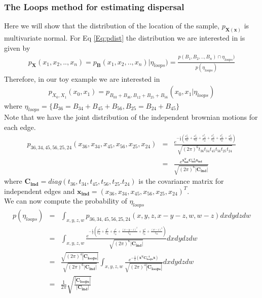 \subsubsection{The Loops method for estimating dispersal}
Here we will show that the distribution of the location of the sample, $p_\mathbf{X(x) }$ is multivariate normal.
For Eq \ref{Eq:pdist} the distribution we are interested in is given by 
\begin{eqnarray*}
     p_\mathbf{X}(x_1,x_2,..,x_n) = p_\mathbf{B}(x_1,x_2,..,x_n) | \eta_{loops}) = \frac{p(B_1,B_2,..,B_n) \cap \eta_{loops})}{p(\eta_{loops})}
\end{eqnarray*}
Therefore, in our toy example we are interested in 
\begin{eqnarray*}
     p_{X_0,X_1}(x_0,x_1) = p_{B_{03} + B_{36},B_{12}+B_{25}+B_{56}}(x_0,x_1 | \eta_{loops})
     \end{eqnarray*}
where $\eta_{loops} = \{ B_{36} = B_{34} + B_{45} + B_{56}, B_{25} = B_{24} + B_{45}  \} $ \\ 
Note that we have the joint distribution of the independent brownian motions for each edge. 
\begin{eqnarray*}
    p_{36,34,45,56,25,24}(x_{36},x_{34},x_{45},x_{56},x_{25},x_{24})  &=& \frac{e^{ -\frac{1}{2}( \frac{x_{36}^2}{t_{36}} + \frac{x_{34}^2}{t_{34}} + \frac{x_{45}^2}{t_{45}} + \frac{x_{56}^2}{t_{56}} + \frac{x_{25}^2}{t_{25}} + \frac{x_{24}^2}{t_{24}}  ) }}{\sqrt{ (2\pi)^6 t_{36}t_{34}t_{45}t_{56}t_{25}t_{24}  }}  \\
    &=& \frac{ e^{ \mathbf{x_{ind}^T C_{ind}^{-1} x_{ind}} }}{\sqrt{ (2\pi)^6 |\mathbf{C_{ind}}| }}
\end{eqnarray*}
where $\mathbf{C_{ind}} = diag(t_{36}, t_{34}, t_{45}, t_{56}, t_{25}. t_{24})$ is the covariance matrix for independent edges and $\mathbf{x_{ind}} = (x_{36},x_{34},x_{45},x_{56},x_{25},x_{24})^T $. \\
We can now compute the probability of $\eta_{loops}$
\begin{eqnarray*}
    \displaystyle p(\eta_{loops}) &=& \int_{x,y,z,w} p_{36,34,45,56,25,24}(x,y,z,x-y-z,w,w-z) dxdydzdw \\
    &=& \int_{x,y,z,w} \frac{e^{ -\frac{1}{2}( \frac{x^2}{t_{36}} + \frac{y^2}{t_{34}} + \frac{z^2}{t_{45}} + \frac{(x-y-z)^2}{t_{56}} + \frac{w^2}{t_{25}} + \frac{(w-z)^2}{t_{24}}  ) }}{\sqrt{ (2\pi)^6 |\mathbf{C_{ind}}| }} dxdydzdw \\
    &=& \frac{\sqrt{ (2\pi)^4 |\mathbf{C_{loops}}| }}{\sqrt{ (2\pi)^6 |\mathbf{C_{ind}}| }} \int_{x,y,z,w} \frac{e^{ -\frac{1}{2}( \mathbf{x^TC_{loops}^{-1}x}  ) }}{\sqrt{ (2\pi)^4 |\mathbf{C_{loops}}| }} dxdydzdw \\
    &=& \frac{1}{2\pi} \sqrt{\frac{ |\mathbf{C_{loops}}| }{ |\mathbf{C_{ind}}| } }
\end{eqnarray*}
